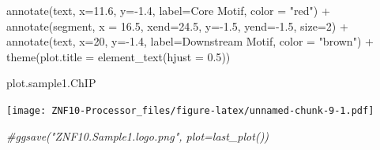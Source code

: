 \documentclass[
]{article}
\newenvironment{Shaded}{\begin{snugshade}}{\end{snugshade}}
\newcommand{\AttributeTok}[1]{\textcolor[rgb]{0.77,0.63,0.00}{#1}}
\newcommand{\CommentTok}[1]{\textcolor[rgb]{0.56,0.35,0.01}{\textit{#1}}}
\newcommand{\DecValTok}[1]{\textcolor[rgb]{0.00,0.00,0.81}{#1}}
\newcommand{\FloatTok}[1]{\textcolor[rgb]{0.00,0.00,0.81}{#1}}
\newcommand{\FunctionTok}[1]{\textcolor[rgb]{0.00,0.00,0.00}{#1}}
\newcommand{\NormalTok}[1]{#1}
\newcommand{\SpecialCharTok}[1]{\textcolor[rgb]{0.00,0.00,0.00}{#1}}
\newcommand{\StringTok}[1]{\textcolor[rgb]{0.31,0.60,0.02}{#1}}
\begin{document}
\begin{Shaded}
\begin{Highlighting}[]
  \FunctionTok{annotate}\NormalTok{(}\StringTok{\textquotesingle{}text\textquotesingle{}}\NormalTok{, }\AttributeTok{x=}\FloatTok{11.6}\NormalTok{, }\AttributeTok{y=}\SpecialCharTok{{-}}\FloatTok{1.4}\NormalTok{, }\AttributeTok{label=}\StringTok{\textquotesingle{}Core Motif\textquotesingle{}}\NormalTok{, }\AttributeTok{color =} \StringTok{"red"}\NormalTok{) }\SpecialCharTok{+} 
  \FunctionTok{annotate}\NormalTok{(}\StringTok{\textquotesingle{}segment\textquotesingle{}}\NormalTok{, }\AttributeTok{x =} \FloatTok{16.5}\NormalTok{, }\AttributeTok{xend=}\FloatTok{24.5}\NormalTok{, }\AttributeTok{y=}\SpecialCharTok{{-}}\FloatTok{1.5}\NormalTok{, }\AttributeTok{yend=}\SpecialCharTok{{-}}\FloatTok{1.5}\NormalTok{, }\AttributeTok{size=}\DecValTok{2}\NormalTok{) }\SpecialCharTok{+} 
  \FunctionTok{annotate}\NormalTok{(}\StringTok{\textquotesingle{}text\textquotesingle{}}\NormalTok{, }\AttributeTok{x=}\DecValTok{20}\NormalTok{, }\AttributeTok{y=}\SpecialCharTok{{-}}\FloatTok{1.4}\NormalTok{, }\AttributeTok{label=}\StringTok{\textquotesingle{}Downstream Motif\textquotesingle{}}\NormalTok{, }\AttributeTok{color =} \StringTok{"brown"}\NormalTok{) }\SpecialCharTok{+} 
  \FunctionTok{theme}\NormalTok{(}\AttributeTok{plot.title =} \FunctionTok{element\_text}\NormalTok{(}\AttributeTok{hjust =} \FloatTok{0.5}\NormalTok{))}


\NormalTok{plot.sample1.ChIP}
\end{Highlighting}
\end{Shaded}

\texttt{[image: ZNF10-Processor\_files/figure-latex/unnamed-chunk-9-1.pdf]}

\begin{Shaded}
\begin{Highlighting}[]
\CommentTok{\#ggsave("ZNF10.Sample1.logo.png", plot=last\_plot())}
\end{Highlighting}
\end{Shaded}
\end{document}
